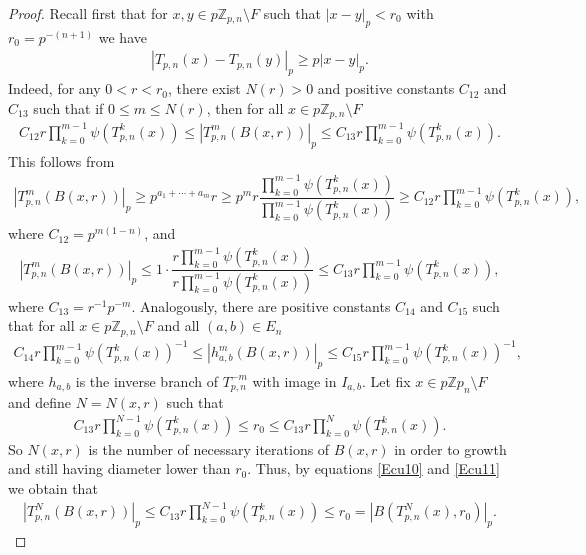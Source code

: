 \documentclass[11pt]{amsart}
\theoremstyle{remark}
\numberwithin{equation}{section}
\newcommand{\Z}{\mathbb{Z}}
\begin{document}
\begin{proof}
     Recall first that for $x,y\in  p\Z_{p,n}\setminus F$ such that $|x-y|_{p}<r_{0}$ with  $r_{0}=p^{-(n+1)}$ we have 
     \begin{align*}
         |T_{p,n}(x)-T_{p,n}(y)|_{p}\geq p|x-y|_{p}.
     \end{align*}Indeed, for any $0<r<r_{0}$, there exist $N(r)>0$ and positive constants $C_{12}$ and $C_{13}$ such that if $0\leq m \leq N(r)$, then for all $x\in  p\Z_{p,n}\setminus F$
     \begin{align}\label{Ecu10}
         C_{12}r\prod^{m-1}_{k=0}\psi(T_{p,n}^{k}(x))\leq  |T_{p,n}^{m}(B(x,r))|_{p}\leq C_{13}r\prod^{m-1}_{k=0}\psi(T^{k}_{p,n}(x)).
     \end{align} This follows from
     \begin{align*}
         |T_{p,n}^{m}(B(x,r))|_{p}\geq p^{a_{1}+\cdots +a_{m}}r\geq p^{m}r\dfrac{\prod^{m-1}_{k=0}\psi(T_{p,n}^{k}(x))}{\prod^{m-1}_{k=0}\psi(T_{p,n}^{k}(x))}\geq C_{12}r\prod^{m-1}_{k=0}\psi(T_{p,n}^{k}(x)),
     \end{align*}where $C_{12}=p^{m(1-n)}$, and
     \begin{align*}
         |T_{p,n}^{m}(B(x,r))|_{p}\leq 1\cdot \dfrac{r\prod^{m-1}_{k=0}\psi(T_{p,n}^{k}(x))}{r\prod^{m-1}_{k=0}\psi(T_{p,n}^{k}(x))}\leq C_{13}r\prod^{m-1}_{k=0}\psi(T_{p,n}^{k}(x)),
     \end{align*} where $C_{13}=r^{-1}p^{-m}$.  Analogously, there are positive constants $C_{14}$ and $C_{15}$ such that for all $x\in p\Z_{p,n}\setminus F$ and all $(a,b)\in E_{n}$ 
\begin{align}\label{Ecu11}
         C_{14}r\prod^{m-1}_{k=0}\psi(T_{p,n}^{k}(x))^{-1}\leq  |h_{a,b}^{m}(B(x,r))|_{p}\leq C_{15}r\prod^{m-1}_{k=0}\psi(T^{k}_{p,n}(x))^{-1},
     \end{align} where $h_{a,b}$  is the inverse branch of  $T^{-m}_{p,n}$ with image in $I_{a,b}$. Let fix $x\in p\Z p_{n}\setminus F$ and define $N=N(x,r)$ such that 
     \begin{align*}
         C_{13}r\prod^{N-1}_{k=0}\psi(T^{k}_{p,n}(x))\leq r_{0}\leq C_{13}r\prod^{N}_{k=0}\psi(T^{k}_{p,n}(x)).
     \end{align*} So $N(x,r)$ is the number of necessary iterations of $B(x,r)$ in order to growth and still having diameter lower than $r_{0}$. Thus, by equations \eqref{Ecu10} and \eqref{Ecu11} we obtain that
\begin{align*}
    \left|T_{p,n}^{N}(B(x,r))\right|_{p}\leq C_{13}r\prod^{N-1}_{k=0}\psi(T^{k}_{p,n}(x))\leq r_{0}=\left|B(T^{N}_{p,n}(x),r_{0})\right|_{p}.

\end{align*}
\end{proof}
\end{document}
